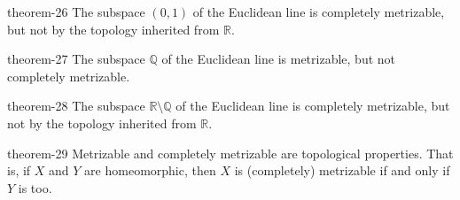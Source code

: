 \documentclass[10pt,]{article}
\newcommand{\mb}{\mathbb}
\begin{document}
\begin{theorem}{}{}{theorem-26}%
\hypertarget{p-134}{}%
The subspace \((0,1)\) of the Euclidean line is completely metrizable, but not by the topology inherited from \(\mb R\).%
\end{theorem}
\begin{theorem}{}{}{theorem-27}%
\hypertarget{p-135}{}%
The subspace \(\mb Q\) of the Euclidean line is metrizable, but not completely metrizable.%
\end{theorem}
\begin{theorem}{}{}{theorem-28}%
\hypertarget{p-136}{}%
The subspace \(\mb R\setminus\mb Q\) of the Euclidean line is completely metrizable, but not by the topology inherited from \(\mb R\).%
\end{theorem}
\begin{theorem}{}{}{theorem-29}%
\hypertarget{p-137}{}%
Metrizable and completely metrizable are topological properties. That is, if \(X\) and \(Y\) are homeomorphic, then \(X\) is (completely) metrizable if and only if \(Y\) is too.%
\end{theorem}
%
%
\typeout{************************************************}
\typeout{************************************************}
%
\end{document}
